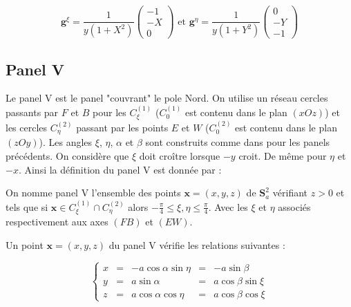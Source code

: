 \begin{equation}
\mathbf{g}^{\xi} = \dfrac{1}{y(1+X^2)}\begin{pmatrix}
-1 \\ -X \\ 0
\end{pmatrix} \text{ et } \mathbf{g}^{\eta} = \dfrac{1}{y(1+Y^2)}\begin{pmatrix}
0 \\ -Y \\ -1
\end{pmatrix}
\label{eq: base duale IV}
\end{equation}













\subsection{Panel V}

Le panel V est le panel "couvrant" le pole Nord. On utilise un réseau cercles passants par $F$ et $B$ pour les $C_{\xi}^{(1)}$ ($C_{0}^{(1)}$ est contenu dans le plan $(xOz)$) et les cercles $C_{\eta}^{(2)}$ passant par les points $E$ et $W$ ($C_{0}^{(2)}$ est contenu dans le plan $(zOy)$). Les angles $\xi$, $\eta$, $\alpha$ et $\beta$ sont construits comme dans pour les panels précédents.  On considère que $\xi$ doit croître lorsque $-y$ croit. De même pour $\eta$ et $-x$. 
Ainsi la définition du panel V est donnée par :

\begin{definition}
On nomme panel V l'ensemble des points $\mathbf{x}=(x,y,z)$ de $\mathbf{S}_a^2$ vérifiant $z>0$ et tels que si $\mathbf{x} \in C_{\xi}^{(1)} \cap C_{\eta}^{(2)}$ alors $-\frac{\pi}{4}\leq \xi,\eta \leq \frac{\pi}{4}$. Avec les $\xi$ et $\eta$ associés respectivement aux axes $(FB)$ et $(EW)$.
\end{definition}

Un point $\mathbf{x}=(x,y,z)$ du panel V vérifie les relations suivantes :

\begin{equation}
\left\lbrace
\begin{array}{rcccc}
x & = & -a \cos \alpha \sin \eta & = & - a \sin \beta \\
y & = & a \sin \alpha & = & a \cos \beta \sin \xi \\
z & = & a \cos \alpha \cos \eta & = & a \cos \beta \cos \xi
\end{array}
\right.
\end{equation}

